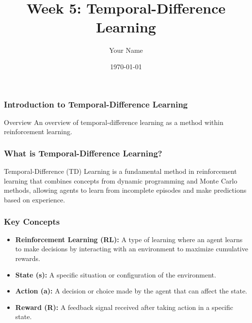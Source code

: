 \documentclass[aspectratio=169]{beamer}
\title[Week 5: Temporal-Difference Learning]{Week 5: Temporal-Difference Learning}
\author[J. Smith]{Your Name}
\institute[Your Institution]{
  Your Department\\
  Your Institution\\
  \vspace{0.3cm}
  Email: your.email@example.com\\
  Website: www.yourwebsite.edu
}
\date{\today}
\begin{document}
\frame{\titlepage}

\begin{frame}[fragile]
    \frametitle{Introduction to Temporal-Difference Learning}
    \begin{block}{Overview}
        An overview of temporal-difference learning as a method within reinforcement learning.
    \end{block}
\end{frame}

\begin{frame}[fragile]
    \frametitle{What is Temporal-Difference Learning?}
    Temporal-Difference (TD) Learning is a fundamental method in reinforcement learning that combines concepts from dynamic programming and Monte Carlo methods, allowing agents to learn from incomplete episodes and make predictions based on experience.
\end{frame}

\begin{frame}[fragile]
    \frametitle{Key Concepts}
    \begin{itemize}
        \item \textbf{Reinforcement Learning (RL):} A type of learning where an agent learns to make decisions by interacting with an environment to maximize cumulative rewards.
        \item \textbf{State (s):} A specific situation or configuration of the environment.
        \item \textbf{Action (a):} A decision or choice made by the agent that can affect the state.
        \item \textbf{Reward (R):} A feedback signal received after taking action in a specific state.
    \end{itemize}
\end{frame}
\end{document}
